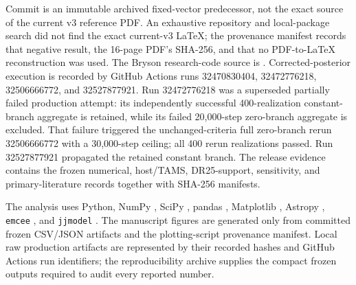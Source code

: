 Commit  is an immutable
archived fixed-vector predecessor, not the exact source of the current v3
reference PDF. An exhaustive repository and local-package search did not find
the exact current-v3 LaTeX; the provenance manifest records that negative
result, the 16-page PDF's SHA-256, and that no PDF-to-LaTeX reconstruction was
used. The Bryson research-code source is
. Corrected-posterior execution
is recorded by GitHub Actions runs 32470830404, 32472776218, 32506666772, and
32527877921. Run 32472776218 was a superseded partially failed production
attempt: its independently successful 400-realization constant-branch
aggregate is retained, while its failed 20,000-step zero-branch aggregate is
excluded. That failure triggered the unchanged-criteria full zero-branch rerun
32506666772 with a 30,000-step ceiling; all 400 rerun realizations passed. Run
32527877921 propagated the retained constant branch. The release evidence
contains the frozen numerical, host/TAMS, DR25-support, sensitivity, and
primary-literature records together with SHA-256 manifests.

The analysis uses Python, NumPy \citep{Harris2020}, SciPy
\citep{Virtanen2020}, pandas
\citep{McKinney2010}, Matplotlib \citep{Hunter2007}, Astropy
\citep{Astropy2022}, \texttt{emcee} \citep{ForemanMackey2013}, and
\texttt{jjmodel} \citep{Sysoliatina2022}. The manuscript figures are generated
only from committed frozen CSV/JSON artifacts and the plotting-script
provenance manifest. Local raw production artifacts
are represented by their recorded hashes and GitHub Actions run identifiers;
the reproducibility archive supplies the compact frozen outputs required to
audit every reported number.
